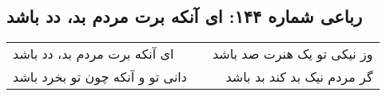\begin{center}
\section*{رباعی شماره ۱۴۴: ای آنکه برت مردم بد، دد باشد}
\label{sec:sh144}
\begin{longtable}{l p{0.5cm} r}
ای آنکه برت مردم بد، دد باشد
&&
وز نیکی تو یک هنرت صد باشد
\\
دانی تو و آنکه چون تو بخرد باشد
&&
گر مردم نیک بد کند بد باشد
\\
\end{longtable}
\end{center}
